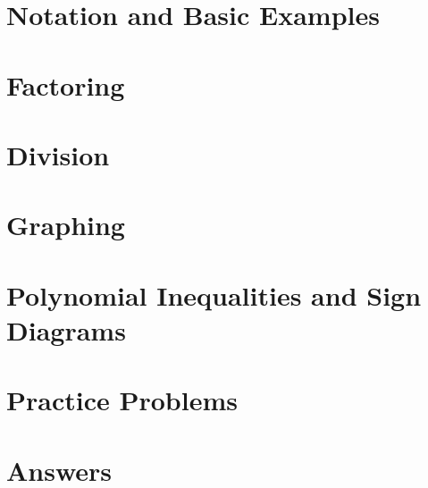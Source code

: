 \section{Notation and Basic Examples}

\newpage

\section{Factoring}

\newpage


\newpage

\section{Division}

\newpage


\newpage

\section{Graphing}

\newpage


\newpage

\section{Polynomial Inequalities and Sign Diagrams}

\newpage

\section{Practice Problems}

\newpage

\section{Answers}

\newpage
\closegraphsfile